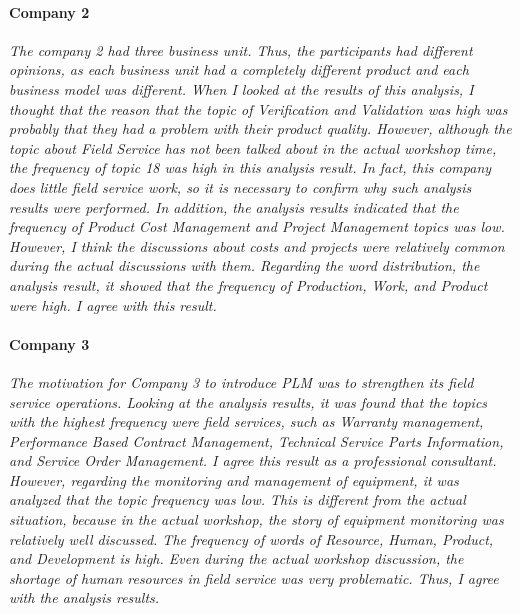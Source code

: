 \documentclass[conference]{IEEEtran}
\begin{document}
\begin{table}[t]
\caption{Similarity and Top Words}
\label{table 6: similarity}
\end{table}

\paragraph{Company 2}{\it The company 2 had three business unit. Thus, the participants had different opinions, as each business unit had a completely different product and each business model was different. When I looked at the results of this analysis, I thought that the reason that the topic of Verification and Validation was high was probably that they had a problem with their product quality. However, although the topic about Field Service has not been talked about in the actual workshop time, the frequency of topic 18 was high in this analysis result. In fact, this company does little field service work, so it is necessary to confirm why such analysis results were performed. In addition, the analysis results indicated that the frequency of Product Cost Management and Project Management topics was low. However, I think the discussions about costs and projects were relatively common during the actual discussions with them. Regarding the word distribution, the analysis result, it showed that the frequency of Production, Work, and Product were high. I agree with this result.}

\paragraph{Company 3}{\it The motivation for Company 3 to introduce PLM was to strengthen its field service operations. Looking at the analysis results, it was found that the topics with the highest frequency were field services, such as Warranty management, Performance Based Contract Management, Technical Service Parts Information, and Service Order Management. I agree this result as a professional consultant. However, regarding the monitoring and management of equipment, it was analyzed that the topic frequency was low. This is different from the actual situation, because in the actual workshop, the story of equipment monitoring was relatively well discussed. The frequency of words of Resource, Human, Product, and Development is high. Even during the actual workshop discussion, the shortage of human resources in field service was very problematic. Thus, I agree with the analysis results.}
\end{document}

